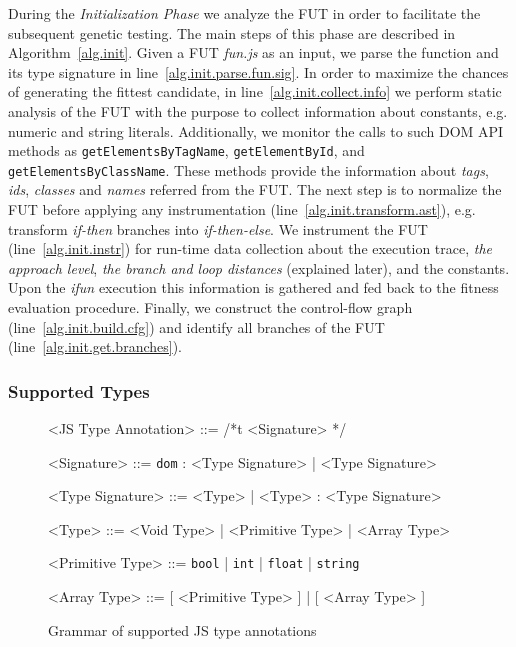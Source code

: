 During the \emph{Initialization Phase} we analyze the FUT in order to facilitate the subsequent genetic testing. The main steps of this phase are described in Algorithm~\ref{alg.init}. Given a FUT \emph{fun.js} as an input, we parse the function and its type signature in line~\ref{alg.init.parse.fun.sig}. In order to maximize the chances of generating the fittest candidate, in line~\ref{alg.init.collect.info} we perform static analysis of the FUT with the purpose to collect information about constants, e.g. numeric and string literals. Additionally, we monitor the calls to such DOM API methods as \texttt{getElementsByTagName}, \texttt{getElementById}, and \texttt{getElementsByClassName}. These methods provide the information about \emph{tags}, \emph{ids}, \emph{classes} and \emph{names} referred from the FUT. The next step is to normalize the FUT before applying any instrumentation (line~\ref{alg.init.transform.ast}), e.g. transform \emph{if-then} branches into \emph{if-then-else}. We instrument the FUT (line~\ref{alg.init.instr}) for run-time data collection about the execution trace, \emph{the approach level}, \emph{the branch and loop distances} (explained later), and the constants. Upon the \emph{ifun} execution this information is gathered and fed back to the fitness evaluation procedure. Finally, we construct the control-flow graph (line~\ref{alg.init.build.cfg}) and identify all branches of the FUT (line~\ref{alg.init.get.branches}).

\subsubsection{Supported Types}
\label{sub.sec.sup.types}

\begin{figure}[!t]
\setlength{\grammarparsep}{3pt}
\scriptsize
\begin{grammar}
<JS Type Annotation> ::= /*t <Signature> */

<Signature> ::= \texttt{dom} : <Type Signature> | <Type Signature>

<Type Signature> ::= <Type> | <Type> : <Type Signature>

<Type> ::= <Void Type> | <Primitive Type> | <Array Type>

<Primitive Type> ::= \texttt{bool} | \texttt{int} | \texttt{float} | \texttt{string}

<Array Type> ::= [ <Primitive Type> ] | [ <Array Type> ]
\end{grammar}
\caption{Grammar of supported JS type annotations}
\label{fig.js.type.annot}
\end{figure}

